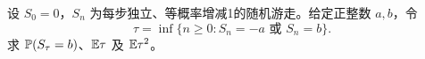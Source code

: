 设 $S_0=0$，$S_n$ 为每步独立、等概率增减1的随机游走。给定正整数 $a,b$，令
\[
 \tau=\inf\{n\ge0:S_n=-a\text{ 或 }S_n=b\}.
\]
求 $\mathbb{P}(S_\tau=b)$、$\mathbb{E}\tau$ 及 $\mathbb{E}\tau^2$。
